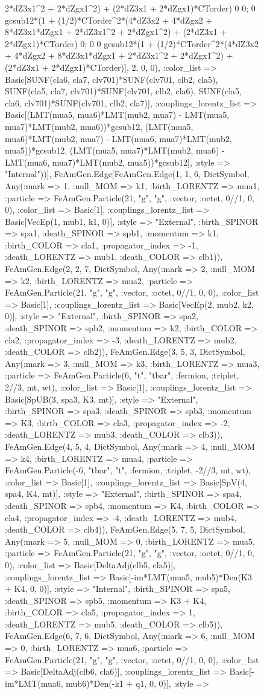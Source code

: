 \documentclass{revtex4}
\begin{document}
\begin{figure}[!htb]
\begin{center}
{2*dZ3x1^2 + 2*dZgx1^2) + (2*dZ3x1 + 2*dZgx1)*CTorder) 0 0; 0 gcsub12*(1 + (1/2)*CTorder^2*(4*dZ3x2 + 4*dZgx2 + 8*dZ3x1*dZgx1 + 2*dZ3x1^2 + 2*dZgx1^2) + (2*dZ3x1 + 2*dZgx1)*CTorder) 0; 0 0 gcsub12*(1 + (1/2)*CTorder^2*(4*dZ3x2 + 4*dZgx2 + 8*dZ3x1*dZgx1 + 2*dZ3x1^2 + 2*dZgx1^2) + (2*dZ3x1 + 2*dZgx1)*CTorder)], 2, 0, 0), :color_list => Basic[SUNF(cla6, cla7, clv701)*SUNF(clv701, clb2, cla5), SUNF(cla5, cla7, clv701)*SUNF(clv701, clb2, cla6), SUNF(cla5, cla6, clv701)*SUNF(clv701, clb2, cla7)], :couplings_lorentz_list => Basic[(LMT(mua5, mua6)*LMT(mub2, mua7) - LMT(mua5, mua7)*LMT(mub2, mua6))*gcsub12, (LMT(mua5, mua6)*LMT(mub2, mua7) - LMT(mua6, mua7)*LMT(mub2, mua5))*gcsub12, (LMT(mua5, mua7)*LMT(mub2, mua6) - LMT(mua6, mua7)*LMT(mub2, mua5))*gcsub12], :style => "Internal"))], FeAmGen.Edge[FeAmGen.Edge(1, 1, 6, Dict{Symbol, Any}(:mark => 1, :null_MOM => k1, :birth_LORENTZ => mua1, :particle => FeAmGen.Particle(21, "g", "g", :vector, :octet, 0//1, 0, 0), :color_list => Basic[1], :couplings_lorentz_list => Basic[VecEp(1, mub1, k1, 0)], :style => "External", :birth_SPINOR => spa1, :death_SPINOR => spb1, :momentum => k1, :birth_COLOR => cla1, :propagator_index => -1, :death_LORENTZ => mub1, :death_COLOR => clb1)), FeAmGen.Edge(2, 2, 7, Dict{Symbol, Any}(:mark => 2, :null_MOM => k2, :birth_LORENTZ => mua2, :particle => FeAmGen.Particle(21, "g", "g", :vector, :octet, 0//1, 0, 0), :color_list => Basic[1], :couplings_lorentz_list => Basic[VecEp(2, mub2, k2, 0)], :style => "External", :birth_SPINOR => spa2, :death_SPINOR => spb2, :momentum => k2, :birth_COLOR => cla2, :propagator_index => -3, :death_LORENTZ => mub2, :death_COLOR => clb2)), FeAmGen.Edge(3, 5, 3, Dict{Symbol, Any}(:mark => 3, :null_MOM => k3, :birth_LORENTZ => mua3, :particle => FeAmGen.Particle(6, "t", "tbar", :fermion, :triplet, 2//3, mt, wt), :color_list => Basic[1], :couplings_lorentz_list => Basic[SpUB(3, spa3, K3, mt)], :style => "External", :birth_SPINOR => spa3, :death_SPINOR => spb3, :momentum => K3, :birth_COLOR => cla3, :propagator_index => -2, :death_LORENTZ => mub3, :death_COLOR => clb3)), FeAmGen.Edge(4, 5, 4, Dict{Symbol, Any}(:mark => 4, :null_MOM => k4, :birth_LORENTZ => mua4, :particle => FeAmGen.Particle(-6, "tbar", "t", :fermion, :triplet, -2//3, mt, wt), :color_list => Basic[1], :couplings_lorentz_list => Basic[SpV(4, spa4, K4, mt)], :style => "External", :birth_SPINOR => spa4, :death_SPINOR => spb4, :momentum => K4, :birth_COLOR => cla4, :propagator_index => -4, :death_LORENTZ => mub4, :death_COLOR => clb4)), FeAmGen.Edge(5, 7, 5, Dict{Symbol, Any}(:mark => 5, :null_MOM => 0, :birth_LORENTZ => mua5, :particle => FeAmGen.Particle(21, "g", "g", :vector, :octet, 0//1, 0, 0), :color_list => Basic[DeltaAdj(clb5, cla5)], :couplings_lorentz_list => Basic[-im*LMT(mua5, mub5)*Den(K3 + K4, 0, 0)], :style => "Internal", :birth_SPINOR => spa5, :death_SPINOR => spb5, :momentum => K3 + K4, :birth_COLOR => cla5, :propagator_index => 1, :death_LORENTZ => mub5, :death_COLOR => clb5)), FeAmGen.Edge(6, 7, 6, Dict{Symbol, Any}(:mark => 6, :null_MOM => 0, :birth_LORENTZ => mua6, :particle => FeAmGen.Particle(21, "g", "g", :vector, :octet, 0//1, 0, 0), :color_list => Basic[DeltaAdj(clb6, cla6)], :couplings_lorentz_list => Basic[-im*LMT(mua6, mub6)*Den(-k1 + q1, 0, 0)], :style => }
\end{center}
\end{figure}
\end{document}
